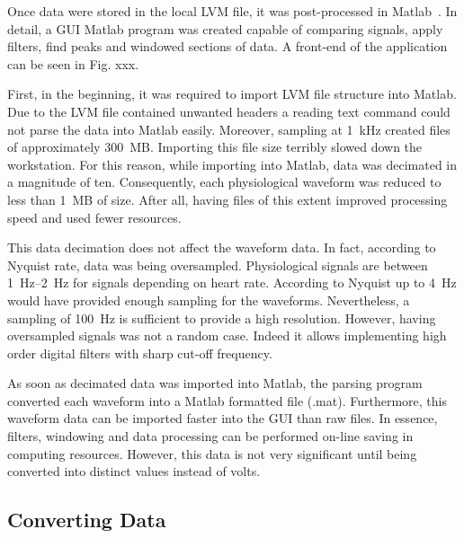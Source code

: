 Once data were stored in the local LVM file, it was post-processed in Matlab~\cite{MATLAB:2016}. In detail, a GUI Matlab program was created capable of comparing signals, apply filters, find peaks and windowed sections of data. A front-end of the application can be seen in Fig. xxx.


First, in the beginning, it was required to import LVM file structure into Matlab. Due to the LVM file contained unwanted headers a reading text command could not parse the data into Matlab easily. Moreover, sampling at \SI{1}{\kilo\hertz} created files of approximately \SI{300}{MB}. Importing this file size terribly slowed down the workstation. For this reason, while importing into Matlab, data was decimated in a magnitude of ten. Consequently, each physiological waveform was reduced to less than \SI{1}{MB} of size. After all, having files of this extent improved processing speed and used fewer resources. 


This data decimation does not affect the waveform data.  In fact, according to Nyquist rate, data was being oversampled. Physiological signals are between \SIrange{1}{2}{\hertz} for signals depending on heart rate. According to Nyquist up to \SI{4}{\hertz} would have provided enough sampling for the waveforms. Nevertheless, a sampling of \SI{100}{\hertz} is sufficient to provide a high resolution. However, having oversampled signals was not a random case. Indeed it allows implementing high order digital filters with sharp cut-off frequency. 


As soon as decimated data was imported into Matlab, the parsing program converted each waveform into a Matlab formatted file (.mat). Furthermore, this waveform data can be imported faster into the GUI than raw files. In essence, filters, windowing and data processing can be performed on-line saving in computing resources. However, this data is not very significant until being converted into distinct values instead of volts.

\subsection{Converting Data}
\label{section4.2.1}

